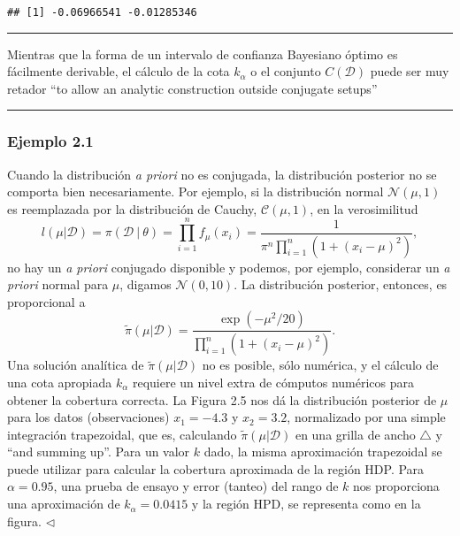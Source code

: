 \documentclass[12pt,]{article}
\begin{document}
\begin{verbatim}
## [1] -0.06966541 -0.01285346
\end{verbatim}

\begin{center}\rule{0.5\linewidth}{\linethickness}\end{center}

Mientras que la forma de un intervalo de confianza Bayesiano óptimo es
fácilmente derivable, el cálculo de la cota \(k_\alpha\) o el conjunto
\(C(\mathcal{D})\) puede ser muy retador ``to allow an analytic
construction outside conjugate setups''

\begin{center}\rule{0.5\linewidth}{\linethickness}\end{center}

\subsubsection{Ejemplo 2.1}\label{ejemplo-2.1}

Cuando la distribución \emph{a priori} no es conjugada, la distribución
posterior no se comporta bien necesariamente. Por ejemplo, si la
distribución normal \(\mathcal{N}(\mu,1)\) es reemplazada por la
distribución de Cauchy, \(\mathcal{C}(\mu,1)\), en la verosimilitud \[
l(\mu|\mathcal{D})=\pi(\mathcal{D}\ |\ \theta)=\prod_{i=1}^{n}f_\mu(x_i)=\frac{1}{\pi^n\prod_{i=1}^n(1+(x_i-\mu)^2)},
\] no hay un \emph{a priori} conjugado disponible y podemos, por
ejemplo, considerar un \emph{a priori} normal para \(\mu\), digamos
\(\mathcal{N}(0,10)\). La distribución posterior, entonces, es
proporcional a \[
\tilde\pi(\mu|\mathcal{D})=\frac{\exp(-\mu^2/20)}{\prod_{i=1}^{n}(1+(x_i-\mu)^2)}.
\] Una solución analítica de \(\tilde\pi(\mu|\mathcal{D})\) no es
posible, sólo numérica, y el cálculo de una cota apropiada \(k_\alpha\)
requiere un nivel extra de cómputos numéricos para obtener la cobertura
correcta. La Figura 2.5 nos dá la distribución posterior de \(\mu\) para
los datos (observaciones) \(x_1=-4.3\) y \(x_2=3.2\), normalizado por
una simple integración trapezoidal, que es, calculando
\(\tilde\pi(\mu|\mathcal{D})\) en una grilla de ancho \(\triangle\) y
``and summing up''. Para un valor \(k\) dado, la misma aproximación
trapezoidal se puede utilizar para calcular la cobertura aproximada de
la región HDP. Para \(\alpha=0.95\), una prueba de ensayo y error
(tanteo) del rango de \(k\) nos proporciona una aproximación de
\(k_\alpha=0.0415\) y la región HPD, se representa como en la figura.
\(\lhd\)
\end{document}
